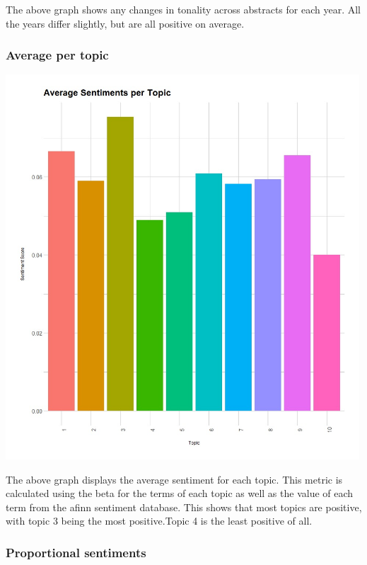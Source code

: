 \documentclass[
  letterpaper,
  DIV=11,
  numbers=noendperiod]{scrartcl}
\begin{document}
The above graph shows any changes in tonality across abstracts for each
year. All the years differ slightly, but are all positive on average.

\hypertarget{average-per-topic}{%
\subsubsection{Average per topic}\label{average-per-topic}}

\includegraphics[width=5.20833in,height=\textheight]{images/aveSentimentPerTopic.jpg}

The above graph displays the average sentiment for each topic. This
metric is calculated using the beta for the terms of each topic as well
as the value of each term from the afinn sentiment database. This shows
that most topics are positive, with topic 3 being the most
positive.Topic 4 is the least positive of all.

\hypertarget{proportional-sentiments}{%
\subsubsection{Proportional sentiments}\label{proportional-sentiments}}
\end{document}
